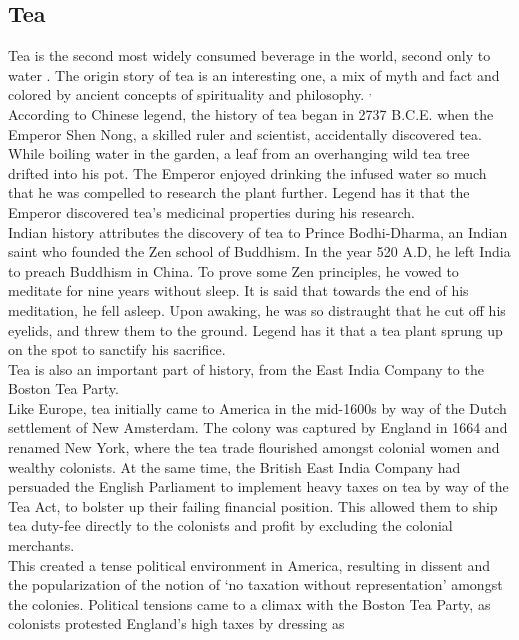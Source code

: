 \documentclass[11pt]{article}
\begin{document}
\subsection{Tea}
Tea is the second most widely consumed beverage in the world, second
only to water \cite{teapop}. The origin story of tea is an interesting
one, a mix of myth and fact and colored by ancient concepts of
spirituality and philosophy. \cite{teastory}$^,$\cite{teawiley}\\
According to Chinese legend, the history of tea began in 2737 B.C.E. when the Emperor Shen Nong, a
skilled ruler and scientist, accidentally discovered tea. While boiling water in the garden, a leaf
from an overhanging wild tea tree drifted into his pot. The Emperor enjoyed drinking the infused
water so much that he was compelled to research the plant further. Legend has it that the Emperor
discovered tea's medicinal properties during his research. \\
Indian history attributes the discovery of tea to Prince Bodhi-Dharma, an Indian saint who founded
the Zen school of Buddhism. In the year 520 A.D, he left India to preach Buddhism in China. To prove
some Zen principles, he vowed to meditate for nine years without sleep. It is said that towards the
end of his meditation, he fell asleep. Upon awaking, he was so distraught that he cut off his
eyelids, and threw them to the ground. Legend has it that a tea plant sprung up on the spot to
sanctify his sacrifice. \cite{teastory} \\
Tea is also an important part of history, from the East India Company to the Boston Tea
Party. \cite{teawiley} \\
Like Europe, tea initially came to America in the mid-1600s by way of the Dutch settlement of New
Amsterdam. The colony was captured by England in 1664 and renamed New York, where the tea trade
flourished amongst colonial women and wealthy colonists.
At the same time, the British East India Company had persuaded the English Parliament to implement
heavy taxes on tea by way of the Tea Act, to bolster up their failing financial position. This
allowed them to ship tea duty-fee directly to the colonists and profit by excluding the colonial
merchants. \cite{eicboston}\\
This created a tense political environment in America, resulting in dissent and the popularization
of the notion of `no taxation without representation' amongst the colonies. Political tensions came
to a climax with the Boston Tea Party, as colonists protested England's high taxes by dressing as
\end{document}
